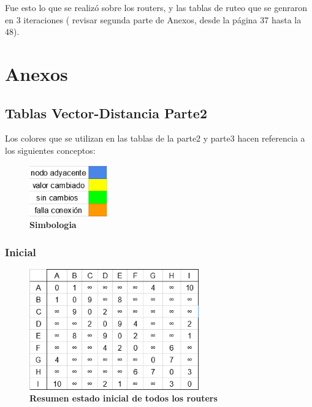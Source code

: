 \documentclass[12pt]{article}
\begin{document}
	Fue esto lo que se realizó sobre los routers, y las tablas de ruteo que se genraron en 3 iteraciones ( revisar segunda parte de Anexos, desde la página 37 hasta la 48).\\

\newpage
\section{Anexos}
 
\subsection{Tablas Vector-Distancia Parte2}
Los colores que se utilizan en las tablas de la parte2 y parte3 hacen referencia a los siguientes conceptos:

\begin{figure}[H] 
\centering 
\includegraphics[width=0.3\textwidth]{imagenes/simbologia.png} \caption{\small \textbf{Simbologia}}
\label{fig:diagrama_6} 
\end{figure}

\subsubsection{Inicial}

\begin{figure}[H] 
\centering 
\includegraphics[width=0.65\textwidth]{imagenes/2inicial.png} \caption{\small \textbf{Resumen estado inicial de todos los routers}}
\label{fig:diagrama_7} 
\end{figure}
\end{document}
